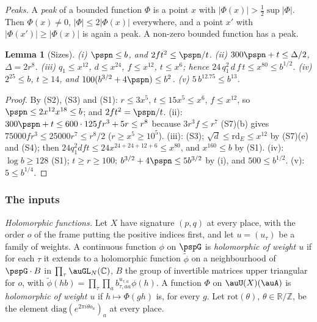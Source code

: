 \documentclass[10pt]{amsart}
\newtheorem{lemma}[theorem]{Lemma}
\theoremstyle{definition}
\theoremstyle{remark}
\newcommand{\C}{\mathbb C}
\newcommand{\R}{\mathbb R}
\newcommand{\Z}{\mathbb Z}
\begin{document}
\emph{Peaks.} A \emph{peak} of a bounded function $\Phi$ is a point $x$ with $|\Phi(x)|>\frac12\sup|
\Phi|$. Then $\Phi(x)\ne0$, $|\Phi|\le2|\Phi(x)|$ everywhere, and a point $x'$ with $|\Phi(x')|\ge|
\Phi(x)|$ is again a peak. A non-zero bounded function has a peak.

\begin{lemma}[Sizes]\label{psp:sizes}
\textup{(i)} $\pspn\le b$, and $2ft^2\le\pspn/t$. \textup{(ii)} $300\pspn+t\le\Delta/2$, $\Delta=2r^8$.
\textup{(iii)} $q_1\le x^{12}$, $d\le x^{24}$, $f\le x^{12}$, $t\le x^6$; hence
$24\,q_1^2\,d\,f\,t\le x^{80}\le b^{1/2}$. \textup{(iv)} $2^{25}\le b$, $t\ge14$, and
$100(b^{3/2}+4\pspn)\le b^2$. \textup{(v)} $5\,b^{12.75}\le b^{13}$.
\end{lemma}
\begin{proof}
By (S2), (S3) and (S1): $r\le3x^5$, $t\le15x^5\le x^6$, $f\le x^{12}$, so $\pspn\le2x^{12}x^{18}\le
b$; and $2ft^2=\pspn/t$. (ii): $300\pspn+t\le600\cdot125fr^3+5r\le r^8$ because $3r^3f\le r^7$ (S7)(b)
gives $75000fr^3\le25000r^7\le r^8/2$ ($r\ge x^5\ge10^5$). (iii): (S3); $\sqrt d\le\mathrm{rd}_E\le x^{12}$
by (S7)(e) and (S4); then $24q_1^2dft\le24x^{24+24+12+6}\le x^{80}$, and $x^{160}\le b$ by (S1).
(iv): $\log b\ge128$ (S1); $t\ge r\ge100$; $b^{3/2}+4\pspn\le5b^{3/2}$ by (i), and $500\le b^{1/2}$.
(v): $5\le b^{1/4}$.
\end{proof}

\subsubsection{The inputs}\label{psp:ss-inputs}

\emph{Holomorphic functions.} Let $X$ have signature $(p,q)$ at every place, with the order $o$ of
the frame putting the positive indices first, and let $u=(u_\tau)$ be a family of weights. A
continuous function $\phi$ on $\pspG$ is \emph{holomorphic of weight $u$} if for each $\tau$ it
extends to a holomorphic function $\tilde\phi$ on a neighbourhood of $\pspG\cdot B$ in
$\prod_\tau\auGL_N(\C)$, $B$ the group of invertible matrices upper triangular for $o$, with
$\tilde\phi(hb)=\prod_\tau\prod_ab_{\tau,aa}^{u_{\tau,a}}\phi(h)$. A function $\Phi$ on
$\auU(X)(\auA)$ is \emph{holomorphic of weight $u$} if $h\mapsto\Phi(gh)$ is, for every $g$. Let
$\mathrm{rot}(\theta)$, $\theta\in\R/\Z$, be the element $\mathrm{diag}(e^{2\pi i\theta o_a})_a$ at
every place.
\end{document}
